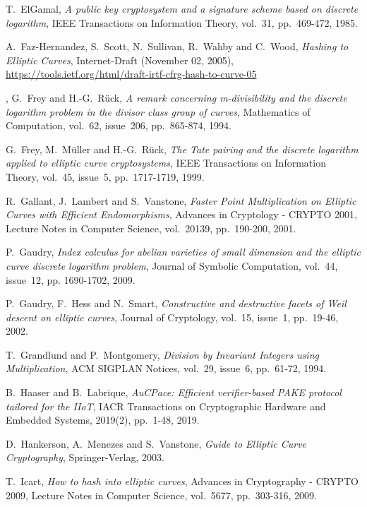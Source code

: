 \documentclass{llncs}
\begin{document}
\begin{thebibliography}{20}
T.~ElGamal,
\emph{A public key cryptosystem and a signature scheme based on discrete
logarithm},
IEEE Transactions on Information Theory, vol.~31, pp.~469-472, 1985.

A.~Faz-Hernandez, S.~Scott, N.~Sullivan, R.~Wahby and C.~Wood,
\emph{Hashing to Elliptic Curves},
Internet-Draft (November 02, 2005),\\
\url{https://tools.ietf.org/html/draft-irtf-cfrg-hash-to-curve-05}

,
G.~Frey and H.-G.~Rück,
\emph{A remark concerning m-divisibility and the discrete logarithm
problem in the divisor class group of curves},
Mathematics of Computation, vol.~62, issue~206, pp.~865-874, 1994.

G.~Frey, M.~Müller and H.-G.~Rück,
\emph{The Tate pairing and the discrete logarithm applied to elliptic
curve cryptosystems},
IEEE Transactions on Information Theory, vol.~45, issue~5,
pp.~1717-1719, 1999.

R.~Gallant, J.~Lambert and S.~Vanstone,
\emph{Faster Point Multiplication on Elliptic Curves with Efficient
Endomorphisms},
Advances in Cryptology - CRYPTO 2001, Lecture Notes in Computer Science,
vol.~20139, pp.~190-200, 2001.

P.~Gaudry,
\emph{Index calculus for abelian varieties of small dimension and the
elliptic curve discrete logarithm problem},
Journal of Symbolic Computation, vol.~44, issue~12, pp. 1690-1702, 2009.

P.~Gaudry, F.~Hess and N.~Smart,
\emph{Constructive and destructive facets of Weil descent on elliptic curves},
Journal of Cryptology, vol.~15, issue~1, pp.~19-46, 2002.

T.~Grandlund and P.~Montgomery,
\emph{Division by Invariant Integers using Multiplication},
ACM SIGPLAN Notices, vol.~29, issue~6, pp.~61-72, 1994.

B.~Haaser and B.~Labrique,
\emph{AuCPace: Efficient verifier-based PAKE protocol tailored for the IIoT},
IACR Transactions on Cryptographic Hardware and Embedded Systems, 2019(2),
pp.~1-48, 2019.

D.~Hankerson, A.~Menezes and S.~Vanstone,
\emph{Guide to Elliptic Curve Cryptography},
Springer-Verlag, 2003.

T.~Icart,
\emph{How to hash into elliptic curves},
Advances in Cryptography - CRYPTO 2009, Lecture Notes in Computer
Science, vol.~5677, pp.~303-316, 2009.


\end{thebibliography}
\end{document}
